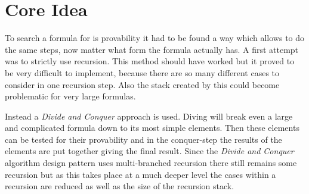 \section{Core Idea}
To search a formula for is provability it had to be found a way which allows to do the same steps, now matter what form the formula actually has. A first attempt was to strictly use recursion. This method should have worked but it proved to be very difficult to implement, because there are so many different cases to consider in one recursion step. Also the stack created by this could become problematic for very large formulas.

Instead a \emph{Divide and Conquer} approach is used. Diving will break even a large and complicated formula down to its most simple elements. Then these elements can be tested for their provability and in the conquer-step the results of the elements are put together giving the final result. Since the \emph{Divide and Conquer} algorithm design pattern uses multi-branched recursion there still remains some recursion but as this takes place at a much deeper level the cases within a recursion are reduced as well as the size of the recursion stack.

